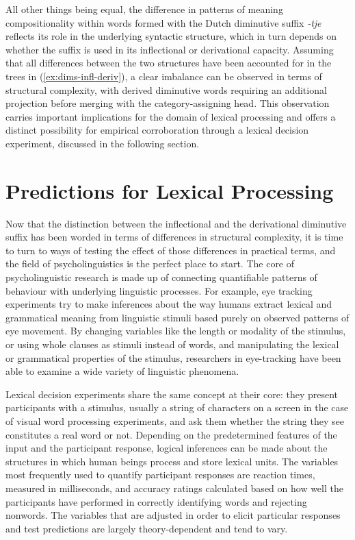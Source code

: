All other things being equal, the difference in patterns of meaning compositionality within words formed with the Dutch diminutive suffix \textit{-tje} reflects its role in the underlying syntactic structure, which in turn depends on whether the suffix is used in its inflectional or derivational capacity. Assuming that all differences between the two structures have been accounted for in the trees in (\ref{ex:dims-infl-deriv}), a clear imbalance can be observed in terms of structural complexity, with derived diminutive words requiring an additional projection before merging with the category-assigning head. This observation carries important implications for the domain of lexical processing and offers a distinct possibility for empirical corroboration through a lexical decision experiment, discussed in the following section.

\section{Predictions for Lexical Processing}
\label{sec:3-preds}
Now that the distinction between the inflectional and the derivational diminutive suffix has been worded in terms of differences in structural complexity, it is time to turn to ways of testing the effect of those differences in practical terms, and the field of psycholinguistics is the perfect place to start. The core of psycholinguistic research is made up of connecting quantifiable patterns of behaviour with underlying linguistic processes. For example, eye tracking experiments try to make inferences about the way humans extract lexical and grammatical meaning from linguistic stimuli based purely on observed patterns of eye movement. By changing variables like the length or modality of the stimulus, or using whole clauses as stimuli instead of words, and manipulating the lexical or grammatical properties of the stimulus, researchers in eye-tracking have been able to examine a wide variety of linguistic phenomena.

Lexical decision experiments share the same concept at their core: they present participants with a stimulus, usually a string of characters on a screen in the case of visual word processing experiments, and ask them whether the string they see constitutes a real word or not. Depending on the predetermined features of the input and the participant response, logical inferences can be made about the structures in which human beings process and store lexical units. The variables most frequently used to quantify participant responses are reaction times, measured in milliseconds, and accuracy ratings calculated based on how well the participants have performed in correctly identifying words and rejecting nonwords. The variables that are adjusted in order to elicit particular responses and test predictions are largely theory-dependent and tend to vary. 

